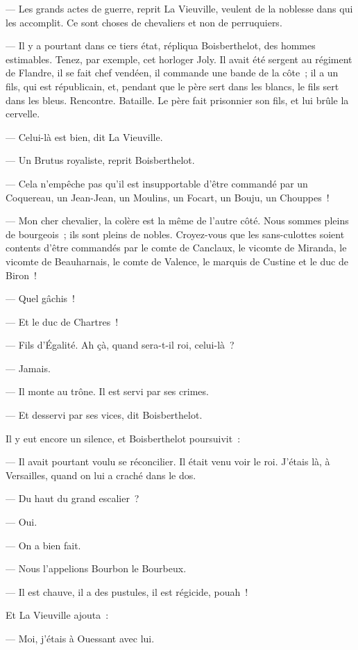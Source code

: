 \documentclass[french,twoside]{book} %
\begin{document}
— Les grands actes de guerre, reprit La Vieuville, veulent de la noblesse dans qui les accomplit. Ce sont choses de chevaliers et non de perruquiers.\par
— Il y a pourtant dans ce tiers état, répliqua  Boisberthelot, des hommes estimables. Tenez, par exemple, cet horloger Joly. Il avait été sergent au régiment de Flandre, il se fait chef vendéen, il commande une bande de la côte ; il a un fils, qui est républicain, et, pendant que le père sert dans les blancs, le fils sert dans les bleus. Rencontre. Bataille. Le père fait prisonnier son fils, et lui brûle la cervelle.\par
— Celui-là est bien, dit La Vieuville.\par
— Un Brutus royaliste, reprit Boisberthelot.\par
— Cela n’empêche pas qu’il est insupportable d’être commandé par un Coquereau, un Jean-Jean, un Moulins, un Focart, un Bouju, un Chouppes !\par
— Mon cher chevalier, la colère est la même de l’autre côté. Nous sommes pleins de bourgeois ; ils sont pleins de nobles. Croyez-vous que les sans-culottes soient contents d’être commandés par le comte de Canclaux, le vicomte de Miranda, le vicomte de Beauharnais, le comte de Valence, le marquis de Custine et le duc de Biron !\par
— Quel gâchis !\par
— Et le duc de Chartres !\par
— Fils d’Égalité. Ah çà, quand sera-t-il roi, celui-là ?\par
— Jamais.\par
— Il monte au trône. Il est servi par ses crimes.\par
— Et desservi par ses vices, dit Boisberthelot.\par
Il y eut encore un silence, et Boisberthelot poursuivit :\par
— Il avait pourtant voulu se réconcilier. Il était  venu voir le roi. J’étais là, à Versailles, quand on lui a craché dans le dos.\par
— Du haut du grand escalier ?\par
— Oui.\par
— On a bien fait.\par
— Nous l’appelions Bourbon le Bourbeux.\par
— Il est chauve, il a des pustules, il est régicide, pouah !\par
Et La Vieuville ajouta :\par
— Moi, j’étais à Ouessant avec lui.\par
\end{document}
